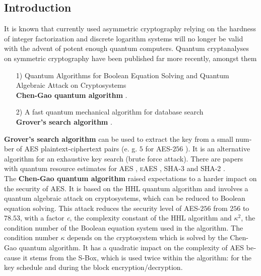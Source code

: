 \documentclass[a4paper,11pt]{article}
\begin{document}
\begin{otherlanguage}{english}
\section{Introduction}

\noindent
It is known that currently used asymmetric cryptography relying on the hardness of integer factorization and discrete logarithm systems will no longer be valid with the advent of potent enough quantum computers. Quantum cryptanalyses on symmetric cryptography have been published far more recently, amongst them \\

\begin{itemize} [noitemsep, nolistsep]
  \item[1)] Quantum Algorithms for Boolean Equation Solving and Quantum Algebraic Attack on Cryptosystems \\
  \textbf{Chen-Gao quantum algorithm} \cite{QAA}.
  \vspace{0.1cm}
  \item[2)] A fast quantum mechanical algorithm for database search \\
  \textbf{Grover’s search algorithm} \cite{GRV}.
  \vspace{0.1cm}
\end{itemize}
\vspace{0.5cm}

\noindent
\textbf{Grover’s search algorithm} can be used to extract the key from a small number of \textsc{AES} plaintext-ciphertext pairs (e. g. $5$ for \textsc{AES}-$256$ \cite{GRO}). It is an alternative algorithm for an exhaustive key search (brute force attack). There are papers with quantum resource estimates for \textsc{AES} \cite{GRO}, \textsc{eAES} \cite{KUN, CEX}, \textsc{SHA-3} \cite{QSH} and \textsc{SHA-2} \cite{QSH}. \\

\noindent
The \textbf{Chen-Gao quantum algorithm} raised expectations to a harder impact on the security of \textsc{AES}. It is based on the \textsc{HHL} quantum algorithm \cite{HHL} and involves a quantum algebraic attack on cryptosystems, which can be reduced to Boolean equation solving. This attack reduces the security level of \textsc{AES}-$256$ from $256$ to $78.53$, with a factor \textit{c}, the complexity constant of the \textsc{HHL} algorithm and $\kappa^2$, the condition number of the Boolean equation system used in the algorithm. The condition number $\kappa$ depends on the cryptosystem which is solved by the Chen-Gao quantum algorithm. It has a quadratic impact on the complexity of \textsc{AES} because it stems from the S-Box, which is used twice within the algorithm: for the key schedule and during the block encryption/decryption. \\


\end{otherlanguage}
\end{document}
